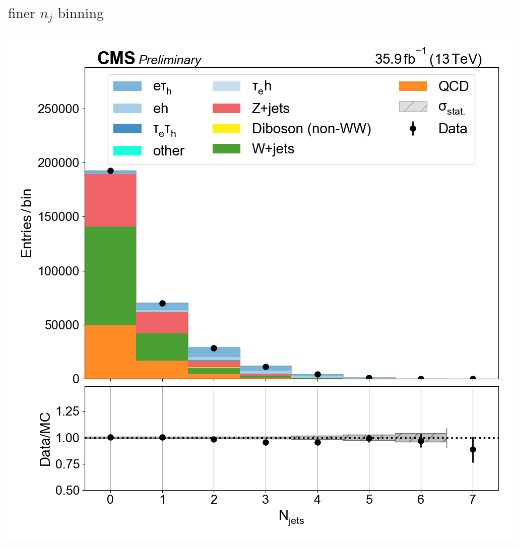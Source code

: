 \begin{frame}{}
    \begin{columns}
        \begin{tcolorbox}[colframe=OliveGreen,colback=white]{finer $n_j$ binning}
            \begin{center}
            \includegraphics[width=\textwidth]{chapters/Analysis/sectionPlots/figures/data_mc_overlays/etau_2016_inclusive_linear_jet_n_jets.png}
            \end{center}
        \end{tcolorbox}
        

\end{columns}
\end{frame}
